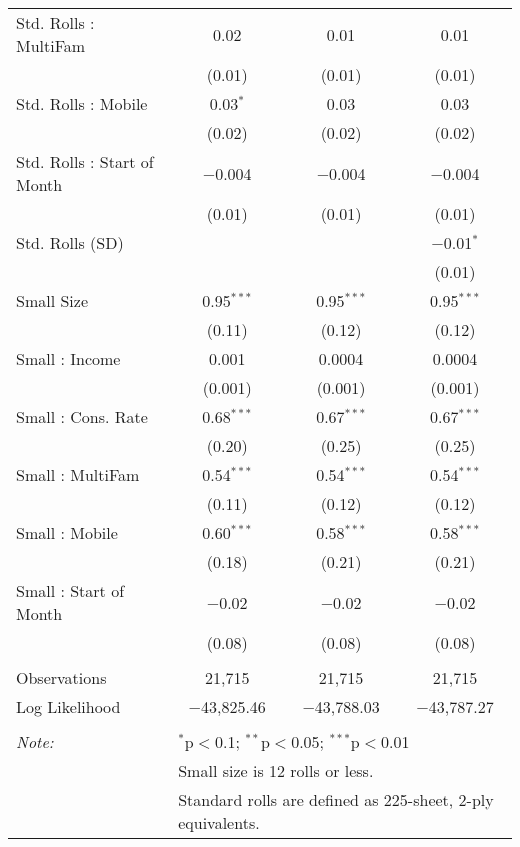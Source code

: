 \begin{table}[!htbp]
\begin{tabular}{@{\extracolsep{5pt}}lccc}
  Std. Rolls : MultiFam & 0.02 & 0.01 & 0.01 \\ 
  & (0.01) & (0.01) & (0.01) \\ 
  Std. Rolls : Mobile & 0.03$^{*}$ & 0.03 & 0.03 \\ 
  & (0.02) & (0.02) & (0.02) \\ 
  Std. Rolls : Start of Month & $-$0.004 & $-$0.004 & $-$0.004 \\ 
  & (0.01) & (0.01) & (0.01) \\ 
  Std. Rolls (SD) &  &  & $-$0.01$^{*}$ \\ 
  &  &  & (0.01) \\ 
  Small Size & 0.95$^{***}$ & 0.95$^{***}$ & 0.95$^{***}$ \\ 
  & (0.11) & (0.12) & (0.12) \\ 
  Small : Income & 0.001 & 0.0004 & 0.0004 \\ 
  & (0.001) & (0.001) & (0.001) \\ 
  Small : Cons. Rate & 0.68$^{***}$ & 0.67$^{***}$ & 0.67$^{***}$ \\ 
  & (0.20) & (0.25) & (0.25) \\ 
  Small : MultiFam & 0.54$^{***}$ & 0.54$^{***}$ & 0.54$^{***}$ \\ 
  & (0.11) & (0.12) & (0.12) \\ 
  Small : Mobile & 0.60$^{***}$ & 0.58$^{***}$ & 0.58$^{***}$ \\ 
  & (0.18) & (0.21) & (0.21) \\ 
  Small : Start of Month & $-$0.02 & $-$0.02 & $-$0.02 \\ 
  & (0.08) & (0.08) & (0.08) \\ 
 \hline \\[-1.8ex] 
Observations & 21,715 & 21,715 & 21,715 \\ 
Log Likelihood & $-$43,825.46 & $-$43,788.03 & $-$43,787.27 \\ 
\hline 
\hline \\[-1.8ex] 
\textit{Note:}  & \multicolumn{3}{l}{$^{*}$p$<$0.1; $^{**}$p$<$0.05; $^{***}$p$<$0.01} \\ 
 & \multicolumn{3}{l}{Small size is 12 rolls or less.} \\ 
 & \multicolumn{3}{l}{Standard rolls are defined as 225-sheet, 2-ply equivalents.} \\ 
\end{tabular} 
\end{table} 
